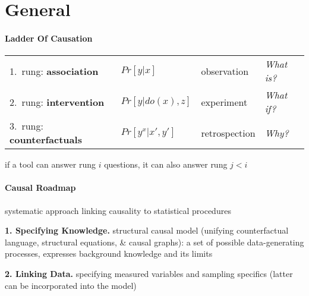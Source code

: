 \documentclass[8pt,twoside]{extarticle}
\begin{document}






\section{General}

\begin{multicols}{2}

\paragraph{Ladder Of Causation} \citep{pearl2019seven}


\begin{minipage}{\textwidth}
\hspace{-0.9em}
\begin{tabular}{l@{\hskip 5pt} l@{\hskip 5pt}l@{\hskip 5pt}l@{\hskip 5pt}}
1.\ rung: \textbf{association} & $Pr\left[y|x\right]$ & observation & \textit{What is?} \\
2.\ rung: \textbf{intervention} & $Pr\left[y|do(x),z\right]$ & experiment & \textit{What if?} \\
3.\ rung: \textbf{counterfactuals} & $Pr\left[y^x|x',y'\right]$ & retrospection & \textit{Why?}
\end{tabular}
\end{minipage}
if a tool can answer rung $i$ questions, it can also answer rung $j<i$


\paragraph{Causal Roadmap} \citep{petersen2014causal} 
systematic approach linking causality to statistical procedures

 \textbf{1. Specifying Knowledge.} structural causal model (unifying counterfactual language, structural equations, \& causal graphs): a set of possible data-generating processes, expresses background knowledge and its limits

 \textbf{2. Linking Data.} specifying measured variables and sampling specifics (latter can be incorporated into the model)


\end{multicols}
\end{document}
